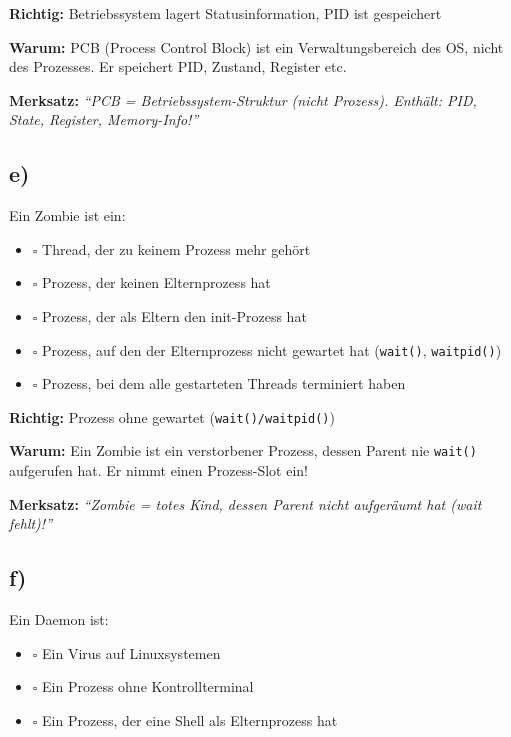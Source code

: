 \documentclass[a4paper,11pt]{article}
\begin{document}
\begin{tcolorbox}[colback=green!15!white,colframe=green!70!black,title=\textbf{Lösung Aufgabe 7d}]
\textbf{Richtig:} \checkmark Betriebssystem lagert Statusinformation, \checkmark PID ist gespeichert

\textbf{Warum:} PCB (Process Control Block) ist ein Verwaltungsbereich des OS, nicht des Prozesses. Er speichert PID, Zustand, Register etc.

\textbf{Merksatz:} \textit{``PCB = Betriebssystem-Struktur (nicht Prozess). Enthält: PID, State, Register, Memory-Info!''} 
\end{tcolorbox}

\subsection*{e)}
Ein Zombie ist ein:
\begin{itemize}[leftmargin=*]
  \item $\square$ Thread, der zu keinem Prozess mehr gehört
  \item $\square$ Prozess, der keinen Elternprozess hat
  \item $\square$ Prozess, der als Eltern den init-Prozess hat
  \item $\square$ Prozess, auf den der Elternprozess nicht gewartet hat (\texttt{wait()}, \texttt{waitpid()})
  \item $\square$ Prozess, bei dem alle gestarteten Threads terminiert haben
\end{itemize}

\begin{tcolorbox}[colback=green!15!white,colframe=green!70!black,title=\textbf{Lösung Aufgabe 7e}]
\textbf{Richtig:} \checkmark Prozess ohne gewartet (\texttt{wait()/waitpid()})

\textbf{Warum:} Ein Zombie ist ein verstorbener Prozess, dessen Parent nie \texttt{wait()} aufgerufen hat. Er nimmt einen Prozess-Slot ein!

\textbf{Merksatz:} \textit{``Zombie = totes Kind, dessen Parent nicht aufgeräumt hat (wait fehlt)!''}
\end{tcolorbox}

\subsection*{f)}
Ein Daemon ist:
\begin{itemize}[leftmargin=*]
  \item $\square$ Ein Virus auf Linuxsystemen
  \item $\square$ Ein Prozess ohne Kontrollterminal
  \item $\square$ Ein Prozess, der eine Shell als Elternprozess hat
\end{itemize}
\end{document}
